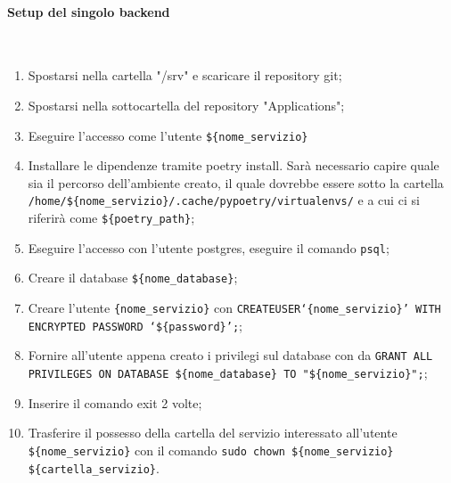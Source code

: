 \documentclass[11pt]{article} %
\begin{document}
\paragraph{Setup del singolo backend}\mbox{}\\
\begin{enumerate}
\item Spostarsi nella cartella "/srv" e scaricare il repository git;
\item Spostarsi nella sottocartella del repository "Applications";
\item Eseguire l'accesso come l'utente \verb|${nome_servizio}|
\item Installare le dipendenze tramite poetry install. Sarà necessario capire quale sia il percorso dell'ambiente creato, il quale dovrebbe essere sotto la cartella \verb|/home/${nome_servizio}/.cache/pypoetry/virtualenvs/| e a cui ci si riferirà come \verb|${poetry_path}|;
\item Eseguire l'accesso con l'utente postgres, eseguire il comando \verb|psql|;
\item Creare il database \verb|${nome_database}|;
\item Creare l'utente \verb|{nome_servizio}| con \verb|CREATEUSER‘{nome_servizio}’ WITH ENCRYPTED PASSWORD ‘${password}’;|;
\item Fornire all'utente appena creato i privilegi sul database con da \verb|GRANT ALL PRIVILEGES ON DATABASE ${nome_database} TO "${nome_servizio}";|;
\item Inserire il comando exit 2 volte;
\item Trasferire il possesso della cartella del servizio interessato all'utente \verb|${nome_servizio}| con il comando \verb|sudo chown ${nome_servizio} ${cartella_servizio}|.
\end{enumerate}
\end{document}
